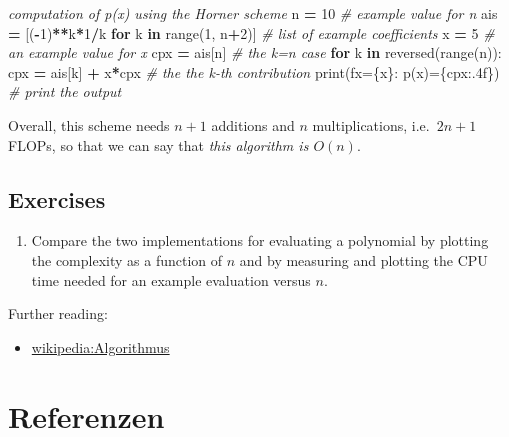 \documentclass[
]{book}
\newenvironment{Shaded}{\begin{snugshade}}{\end{snugshade}}
\newcommand{\BuiltInTok}[1]{#1}
\newcommand{\CommentTok}[1]{\textcolor[rgb]{0.56,0.35,0.01}{\textit{#1}}}
\newcommand{\ControlFlowTok}[1]{\textcolor[rgb]{0.13,0.29,0.53}{\textbf{#1}}}
\newcommand{\DecValTok}[1]{\textcolor[rgb]{0.00,0.00,0.81}{#1}}
\newcommand{\KeywordTok}[1]{\textcolor[rgb]{0.13,0.29,0.53}{\textbf{#1}}}
\newcommand{\NormalTok}[1]{#1}
\newcommand{\OperatorTok}[1]{\textcolor[rgb]{0.81,0.36,0.00}{\textbf{#1}}}
\newcommand{\SpecialCharTok}[1]{\textcolor[rgb]{0.00,0.00,0.00}{#1}}
\newcommand{\SpecialStringTok}[1]{\textcolor[rgb]{0.31,0.60,0.02}{#1}}
\providecommand{\tightlist}{%
  \setlength{\itemsep}{0pt}\setlength{\parskip}{0pt}}
\theoremstyle{definition}
\theoremstyle{definition}
\theoremstyle{definition}
\theoremstyle{definition}
\theoremstyle{remark}
\begin{document}
\begin{Shaded}
\begin{Highlighting}[]
\CommentTok{\textquotesingle{}\textquotesingle{}\textquotesingle{}computation of p(x) using the Horner scheme}
\CommentTok{\textquotesingle{}\textquotesingle{}\textquotesingle{}}
\NormalTok{n }\OperatorTok{=} \DecValTok{10}                                      \CommentTok{\# example value for n}
\NormalTok{ais }\OperatorTok{=}\NormalTok{ [(}\OperatorTok{{-}}\DecValTok{1}\NormalTok{)}\OperatorTok{**}\NormalTok{k}\OperatorTok{*}\DecValTok{1}\OperatorTok{/}\NormalTok{k }\ControlFlowTok{for}\NormalTok{ k }\KeywordTok{in} \BuiltInTok{range}\NormalTok{(}\DecValTok{1}\NormalTok{, n}\OperatorTok{+}\DecValTok{2}\NormalTok{)]  }\CommentTok{\# list of example coefficients}
\NormalTok{x }\OperatorTok{=} \DecValTok{5}                                       \CommentTok{\# an example value for x}
\NormalTok{cpx }\OperatorTok{=}\NormalTok{ ais[n]                                }\CommentTok{\# the k=n case}
\ControlFlowTok{for}\NormalTok{ k }\KeywordTok{in} \BuiltInTok{reversed}\NormalTok{(}\BuiltInTok{range}\NormalTok{(n)):                }
\NormalTok{    cpx }\OperatorTok{=}\NormalTok{ ais[k] }\OperatorTok{+}\NormalTok{ x}\OperatorTok{*}\NormalTok{cpx                    }\CommentTok{\# the the k{-}th contribution}
\BuiltInTok{print}\NormalTok{(}\SpecialStringTok{f\textquotesingle{}x=}\SpecialCharTok{\{x\}}\SpecialStringTok{: p(x)=}\SpecialCharTok{\{}\NormalTok{cpx}\SpecialCharTok{:.4f\}}\SpecialStringTok{\textquotesingle{}}\NormalTok{)             }\CommentTok{\# print the output }
\end{Highlighting}
\end{Shaded}

Overall, this scheme needs \(n+1\) additions and \(n\) multiplications, i.e.~\(2n+1\) FLOPs, so that we can say that \emph{this algorithm is \(O(n)\)}.

\hypertarget{exercises}{%
\section{Exercises}\label{exercises}}

\begin{enumerate}
\def\labelenumi{\arabic{enumi}.}
\tightlist
\item
  Compare the two implementations for evaluating a polynomial by plotting the complexity as a function of \(n\) and by measuring and plotting the CPU time needed for an example evaluation versus \(n\).
\end{enumerate}

Further reading:

\begin{itemize}
\tightlist
\item
  \href{https://de.wikipedia.org/wiki/Algorithmus\#Definition}{wikipedia:Algorithmus}
\end{itemize}

\hypertarget{referenzen}{%
\chapter*{Referenzen}\label{referenzen}}
\end{document}
